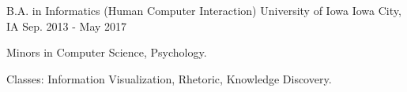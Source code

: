 \begin{cventries}
  \cventry
    {B.A. in Informatics (Human Computer Interaction)}
    {University of Iowa}
    {Iowa City, IA}
    {Sep. 2013 - May 2017}
    {
      \begin{cvitems}
        \item {Minors in Computer Science, Psychology.}
        \item {Classes: Information Visualization, Rhetoric, Knowledge Discovery.}
      \end{cvitems}
    }
\end{cventries}
